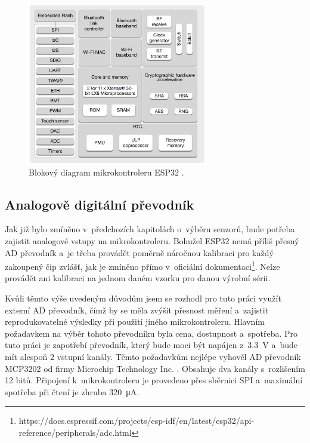 \begin{figure}
    \centering
    \includegraphics[width=0.7\textwidth]{obrazky/esp32_internalStructure.png}
    \caption[Blokový diagram mikrokontroleru ESP32.]{Blokový diagram mikrokontroleru ESP32 \cite{dat_ESP32-WROOM}.}
    \label{fig_ESP32InternalStructure}
\end{figure}

\subsection{Analogově digitální převodník}

Jak již bylo zmíněno v~předchozích kapitolách o~výběru senzorů, bude potřeba zajistit analogové vstupy na mikrokontroleru. Bohužel ESP32 nemá příliš přesný AD převodník a~je třeba provádět poměrně náročnou kalibraci pro každý zakoupený čip zvlášť, jak je zmíněno přímo v~oficiální dokumentaci\footnote{https://docs.espressif.com/projects/esp-idf/en/latest/esp32/api-reference/peripherals/adc.html}. Nelze provádět ani kalibraci na jednom daném vzorku pro danou výrobní sérii.

Kvůli těmto výše uvedeným důvodům jsem se rozhodl pro tuto práci využít externí AD převodník, čímž by se měla zvýšit přesnost měření a~zajistit reprodukovatelné výsledky při použití jiného mikrokontroleru. Hlavním požadavkem na výběr tohoto převodníku byla cena, dostupnost a~spotřeba. Pro tuto práci je zapotřebí převodník, který bude moci být napájen z~\SI{3,3}{\volt} a~bude mít alespoň 2 vstupní kanály. Těmto požadavkům nejlépe vyhověl AD převodník MCP3202 od firmy Microchip Technology Inc. \cite{dat_MCP3202}. Obsahuje dva kanály s~rozlišením 12 bitů. Připojení k~mikrokontroleru je provedeno přes sběrnici SPI a~maximální spotřeba při čtení je zhruba \SI{320}{\micro\ampere}.

